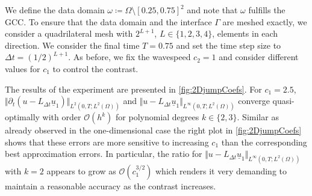 \documentclass[sn-mathphys-num]{sn-jnl}
\numberwithin{equation}{section}
\newcommand{\ul}{\underline{u}}
\newcommand{\dt}{\partial_t}
\begin{document}
We define the data domain $\omega \coloneqq \Omega \setminus [0.25,0.75]^2$ and note that $\omega$ fulfills the GCC. To ensure that the data domain and the interface $\Gamma$ are meshed exactly, we consider a quadrilateral mesh with $2^{L+1}$, $L \in \{1,2,3,4\}$, elements in each direction. We consider the final time $T = 0.75$  and set the time step size to $\Delta t = (1/2)^{L+1}$. As before, we fix the wavespeed $c_2 = 1$ and consider different values for $c_1$ to control the contrast. 

The results of the experiment are presented in \cref{fig:2DjumpCoefs}. 
For $c_1 = 2.5$, $\Vert \dt(u-L_{\Delta t} \ul_1) \Vert_{L^2(0,T;L^2(\Omega))}$ and $\Vert u-L_{\Delta t} \ul_1 \Vert_{L^\infty(0,T;L^2(\Omega))}$ converge quasi-optimally with order $\mathcal{O}(h^k)$ for polynomial degrees $k \in \{2,3\}$. Similar as already observed in the one-dimensional case the right plot in \cref{fig:2DjumpCoefs} shows that these errors are more sensitive to increasing $c_1$ than the corresponding best approximation errors. 
In particular, the ratio for $\Vert u-L_{\Delta t} \ul_1 \Vert_{L^\infty(0,T;L^2(\Omega))}$ with $k=2$ appears to grow as $\mathcal{O}(c_1^{3/2})$ which renders it very demanding to maintain a reasonable accuracy as the contrast increases. 
\end{document}
